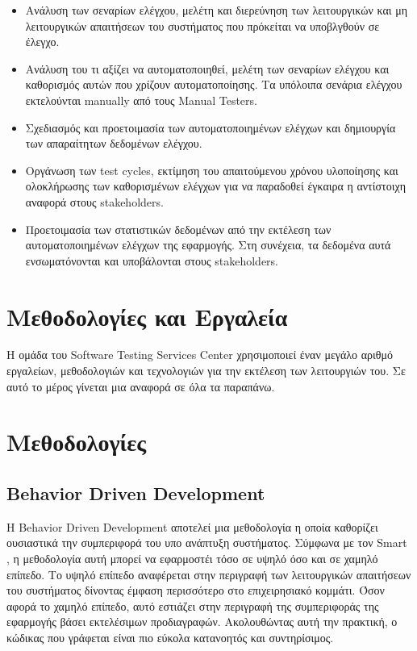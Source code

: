 \begin{itemize}
    \item Ανάλυση των σεναρίων ελέγχου, μελέτη και διερεύνηση των λειτουργικών και μη λειτουργικών απαιτήσεων του συστήματος που πρόκείται να υποβλγθούν σε έλεγχο.
    \item Ανάλυση του τι αξίζει να αυτοματοποιηθεί, μελέτη των σεναρίων ελέγχου και καθορισμός αυτών που χρίζουν αυτοματοποίησης. Τα υπόλοιπα σενάρια ελέγχου εκτελούνται manually από τους Manual Testers.
    \item Σχεδιασμός και προετοιμασία των αυτοματοποιημένων ελέγχων και δημιουργία των απαραίτητων δεδομένων ελέγχου.
    \item Οργάνωση των test cycles, εκτίμηση του απαιτούμενου χρόνου υλοποίησης και ολοκλήρωσης των καθορισμένων ελέγχων για να παραδοθεί έγκαιρα η αντίστοιχη αναφορά στους stakeholders.
    \item Προετοιμασία των στατιστικών δεδομένων από την εκτέλεση των αυτοματοποιημένων ελέγχων της εφαρμογής. Στη συνέχεια, τα δεδομένα αυτά ενσωματόνονται και υποβάλονται στους stakeholders.
\end{itemize}

\section{Μεθοδολογίες και Εργαλεία}

Η ομάδα του Software Testing Services Center χρησιμοποιεί έναν μεγάλο αριθμό εργαλείων, μεθοδολογιών και τεχνολογιών για την εκτέλεση 
των λειτουργιών του. Σε αυτό το μέρος γίνεται μια αναφορά σε όλα τα παραπάνω.

\section*{Μεθοδολογίες}
\subsection*{Behavior Driven Development}
Η Behavior Driven Development αποτελεί μια μεθοδολογία η οποία καθορίζει ουσιαστικά την συμπεριφορά του υπο ανάπτυξη συστήματος. Σύμφωνα με 
τον Smart \cite{bddbook}, η μεθοδολογία αυτή μπορεί να εφαρμοστέι τόσο σε υψηλό όσο και σε χαμηλό επίπεδο. Το υψηλό επίπεδο αναφέρεται στην περιγραφή 
των λειτουργικών απαιτήσεων του συστήματος δίνοντας έμφαση περισσότερο στο επιχειρησιακό κομμάτι. Όσον αφορά το χαμηλό επίπεδο, αυτό εστιάζει 
στην περιγραφή της συμπεριφοράς της εφαρμογής βάσει εκτελέσιμων προδιαγραφών. Ακολουθώντας αυτή την πρακτική, ο κώδικας που γράφεται είναι πιο 
εύκολα κατανοητός και συντηρίσιμος. 

